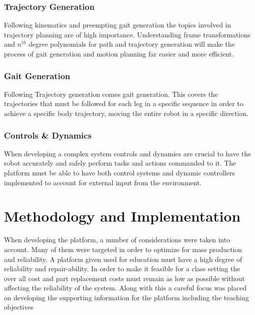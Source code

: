 \documentclass[conference]{IEEEtran}
\begin{document}
\subsubsection{Trajectory Generation}
 Following kinematics and preempting gait generation the topics involved in trajectory planning are of high importance. Understanding frame transformations and $n^{th}$ degree polynomials for path and trajectory generation will make the process of gait generation and motion planning far easier and more efficient. 

\subsubsection{Gait Generation}
 Following Trajectory generation comes gait generation. This covers the trajectories that must be followed for each leg in a specific sequence in order to achieve a specific body trajectory, moving the entire robot in a specific direction.

\subsubsection{Controls \& Dynamics}
  When developing a complex system controls and dynamics are crucial to have the robot accurately and safely perform tasks and actions commanded to it. The platform must be able to have both control systems and dynamic controllers implemented to account for external input from the environment.

\section{Methodology and Implementation}

When developing the platform, a number of considerations were taken into account. Many of them were targeted in order to optimize for mass production and reliability. A platform given used for education must have a high degree of reliability and repair-ability. In order to make it feasible for a class setting the over all cost and part replacement costs must remain as low as possible without affecting the reliability of the system. Along with this a careful focus was placed on developing the supporting information for the platform including the teaching objectives   
\end{document}
